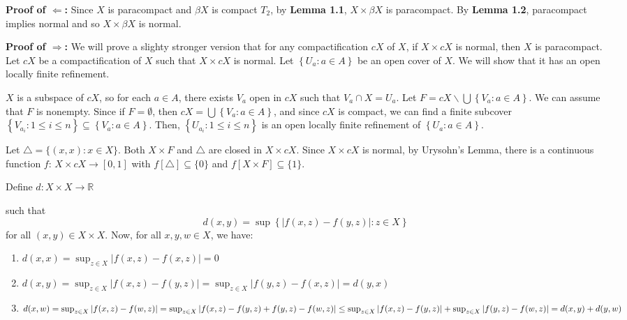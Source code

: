 \documentclass{article}
\begin{document}
\vskip10pt

\textbf{Proof of $\Leftarrow$:} 
Since $X$ is paracompact and $\beta X$ is compact $T_2$, by \textbf{Lemma 1.1}, $X\times \beta X$ is paracompact. 
By \textbf{Lemma 1.2}, paracompact implies normal and so $X\times \beta X$ is normal. 

\vskip 15pt



\textbf{Proof of $\Rightarrow$: }
We will prove a slighty stronger version that for any compactification $cX$ of $X$, if $X \times cX$ is normal, 
then $X$ is paracompact. 
\vskip 10pt
Let $cX$ be a compactification of $X$ such that $X \times cX$ is normal. Let 
$\left\{U_a: a \in A\right\}$ be an open cover of $X$. We will show that it has an open locally finite refinement.

\vskip 10pt

$X$ is a subspace of $cX$, so for each $a \in A$, there exists $V_a$ open in $cX$ such that $V_a \cap X = U_a.$ Let $F=cX\backslash \bigcup \left\{V_a: a\in A\right\}$.  We can assume that $F$ is nonempty. Since if $F=\emptyset$, then $cX=\bigcup \left\{V_a: a\in A\right\}$, and since $cX$ is compact, we can find a finite subcover $\left\{V_{a_i}: 1\leq i \leq n\right\}\subseteq \left\{V_a: a\in A\right\}$. Then, $\left\{U_{a_i}: 1\leq i\leq n\right\}$ is an open locally finite refinement of $\left\{U_a: a \in A\right\}$. 
  

\vskip 10pt

Let $\triangle = \{(x,x): x \in X\}.$
Both $X \times F$ and $\triangle$ are closed in $X \times cX $. Since $X \times cX $ is normal, by Urysohn's Lemma, there is 
a continuous function $f$: $X \times cX \rightarrow [0,1]$ with $f[\triangle] \subseteq \{0\}$ and $f[X\times F] \subseteq
 \{1\}$. 
 
\vskip 15pt 

Define $d: X\times X \rightarrow \mathbb{R}$ 



such that $$d(x,y)=\sup \left\{ \left|f(x,z)-f(y,z)\right|: z\in X\right\}$$ for all $(x,y) \in X \times X$. 
Now, for all $x,y,w \in X$, we have: 

\begin{enumerate}
	\item $d(x,x)=\sup_{z\in X} |f(x,z)-f(x,z)|=0$
	\item $d(x,y)=\sup_{z\in X} |f(x,z)-f(y,z)|=\sup_{z\in X} |f(y,z)-f(x,z)|=d(y,x)$
	\item $d(x,w)=\sup_{z\in X} |f(x,z)-f(w,z)|\\
	=\sup_{z\in X} |f(x,z)-f(y,z)+f(y,z)-f(w,z)|\\
	\leq \sup_{z\in X} |f(x,z)-f(y,z)|+\sup_{z\in X} |f(y,z)-f(w,z)|\\
	=d(x,y)+d(y,w)$
\end{enumerate}
\end{document}

